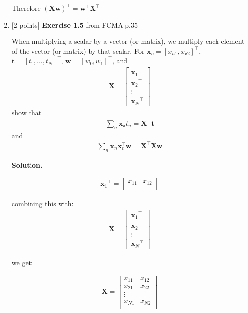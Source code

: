 \documentclass[10pt]{article}
\begin{document}
\begin{enumerate}
Therefore ${(\mathbf{X}\mathbf{w})}^\top = {\mathbf{w}}^\top{\mathbf{X}}^\top$

\item \label{prob:5} [2 points]
{\bf Exercise 1.5} from FCMA p.35  %

When multiplying a scalar by a vector (or matrix), we multiply each element of the vector (or matrix) by that scalar.  For $\mathbf{x}_n = {[ x_{n1}, x_{n2} ]}^\top$, $\mathbf{t} = {[ t_1,...,t_N ]}^\top$, $\mathbf{w} = {[ w_0, w_1 ]}^\top$, and
\begin{eqnarray*}
\mathbf{X} = 
    \begin{bmatrix}
    {\mathbf{x}_{1}}^\top \\[0.3em]
    {\mathbf{x}_{2}}^\top \\[0.3em]
    \vdots \\[0.3em]
    {\mathbf{x}_{N}}^\top
    \end{bmatrix}
\end{eqnarray*}
show that
\begin{eqnarray*}
\sum_{n} \mathbf{x}_n t_n = \mathbf{X}^\top\mathbf{t}
\end{eqnarray*}
and
\begin{eqnarray*}
\sum_{n} \mathbf{x}_n \mathbf{x}_n ^\top \mathbf{w} = \mathbf{X}^\top\mathbf{X} \mathbf{w}
\end{eqnarray*}

{\bf Solution.} 

\begin{eqnarray*}
{\mathbf{x}_{1}}^\top = 
    \begin{bmatrix}
    x_{11} & x_{12} \\[0.3em]
    \end{bmatrix}
\end{eqnarray*}

combining this with:
\begin{eqnarray*}
\mathbf{X} = 
    \begin{bmatrix}
    {\mathbf{x}_{1}}^\top \\[0.3em]
    {\mathbf{x}_{2}}^\top \\[0.3em]
    \vdots \\[0.3em]
    {\mathbf{x}_{N}}^\top
    \end{bmatrix}
\end{eqnarray*}

we get:

\begin{eqnarray*}
\mathbf{X} = 
    \begin{bmatrix}
    x_{11} & x_{12} \\[0.3em]
    x_{21} & x_{22} \\[0.3em]
    \vdots \\[0.3em]
    x_{N1} & x_{N2} \\[0.3em]
    \end{bmatrix}
\end{eqnarray*}


\end{enumerate}
\end{document}
